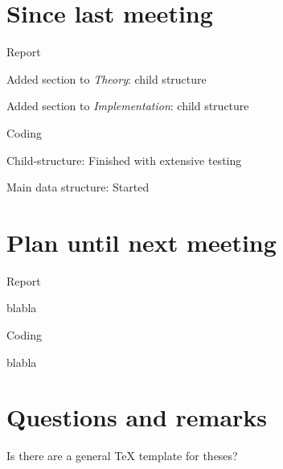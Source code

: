 \documentclass[a4paper,11pt,agenda,chair]{meetingmins}
\begin{document}
\maketitle

\section{Since last meeting}
\begin{items}
\item Report
	\begin{items}
		\item Added section to \textit{Theory}: child structure
		\item Added section to \textit{Implementation}: child structure 
	\end{items}
\item Coding
	\begin{items}
		\item Child-structure: Finished with extensive testing
		\item Main data structure: Started
	\end{items}
\end{items}

\section{Plan until next meeting}
\begin{items}
\item Report
	\begin{items}
		\item blabla
	\end{items}
\item Coding
	\begin{items}
		\item blabla
	\end{items}
\end{items}

\section{Questions and remarks}
\begin{items}
	\item Is there are a general TeX template for theses?
\end{items}
\end{document}
